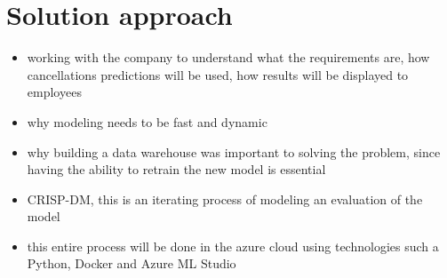 \section{Solution approach}
\begin{itemize}
\item working with the company to understand what the requirements are, how cancellations predictions will be used, how results will be displayed to employees
\item why modeling needs to be fast and dynamic 
\item why building a data warehouse was important to solving the problem, since having the ability to retrain the new model is essential 
\item CRISP-DM, this is an iterating process of modeling an evaluation of the model
\item this entire process will be done in the azure cloud using technologies such a Python, Docker and Azure ML Studio 
\end{itemize}

